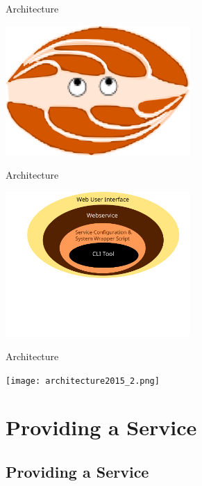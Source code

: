 \documentclass[xcolor=table,10pt,t]{beamer}
\begin{document}
\begin{frame}{Architecture}

    \begin{center}
    \includegraphics[width=70.0mm]{clamup.png}
    \end{center}

\end{frame}

\begin{frame}{Architecture}

    \begin{center}
    \includegraphics[width=70.0mm]{architecture2015_1.png}
    \end{center}

\end{frame}

\begin{frame}{Architecture}

    \begin{center}
    \texttt{[image: architecture2015\_2.png]}
    \end{center}

\end{frame}


\section{Providing a Service}

\subsection{Providing a Service}
\end{document}
